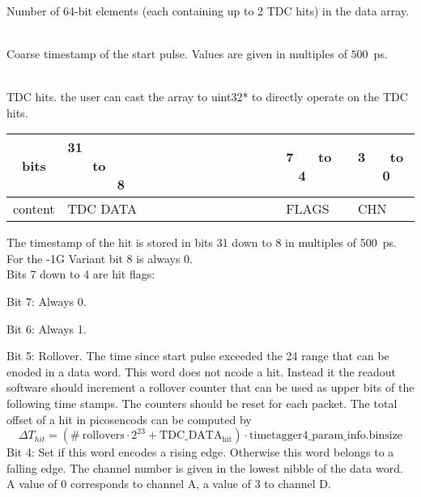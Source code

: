 	\\
	Number of 64-bit elements (each containing up to 2 TDC hits) in the data array.\par

	\\
	Coarse timestamp of the start pulse. Values are given in multiples of $500$~ps.\par

	\\
	TDC hits. the user can cast the array to uint32* to directly operate on the TDC hits.

	\noindent
	\begin{small}
	\begin{tabular}{|c||p{9cm}|p{}|p{}|}
		\hline
		bits & 31~ ~ ~ ~ ~ ~ ~ ~ ~ ~ ~ ~ ~ ~ ~ ~ ~ to ~ ~ ~ ~ ~ ~ ~ ~ ~ ~ ~ ~ ~ ~ ~ ~ ~ 8 & 7~ ~ to ~ ~ 4 & 3~ ~ to ~ ~ 0\\\hline
		content & TDC DATA & FLAGS & CHN \\\hline
	\end{tabular}
	\end{small}

	The timestamp of the hit is stored in bits 31 down to 8 in multiples of 500~ps. For the -1G Variant bit 8 is always 0.\\
	
	\label{flags}
	Bits 7 down to 4 are hit flags:\par
	Bit 7: Always 0.\par
	Bit 6: Always 1.\par
	Bit 5: Rollover. The time since start pulse exceeded the 24 range that can be enoded in a data word. This word does not ncode a hit. 
	Instead it the readout software should increment a rollover counter that can be used as upper bits of the following time stamps.  The counters should be reset for each packet.
	The total offset of a hit in picosencods can be computed by
	\[	\Delta T_{hit} = \mathrm{(\#\ rollovers \cdot 2^{23} + TDC\_ DATA_{hit}) \cdot timetagger4\_param\_info.binsize} \]
	\indent
	Bit 4: Set if this word encodes a rising edge. Otherwise this word belongs to a falling edge.
	The channel number is given in the lowest nibble of the data word. A value of 0 corresponds to channel A, a value of 3 to channel D.\par
